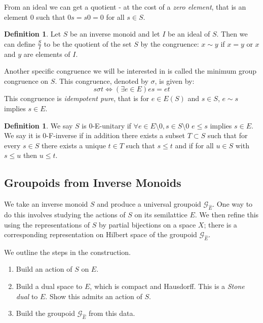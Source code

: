 \documentclass[11pt]{amsart}
\theoremstyle{plain}
\theoremstyle{definition}%
\newtheorem{definition}[theorem]{Definition}%
\theoremstyle{remark}%
\newcommand{\G}{\mathcal{G}}
\newcommand{\E}{\widehat{E}}
\begin{document}
From an ideal we can get a quotient - at the cost of a \textit{zero element}, that is an element $0$ such that $0s=s0=0$ for all $s \in S$.

\begin{definition}
Let $S$ be an inverse monoid and let $I$ be an ideal of $S$. Then we can define $\frac{S}{I}$ to be the quotient of the set $S$ by the congruence: $x \sim y$ if $x=y$ or $x$ and $y$ are elements of $I$. 
\end{definition}

Another specific congruence we will be interested in is called the minimum group congruence on $S$.  This congruence, denoted by $\sigma$, is given by:
\begin{equation*}
s \sigma t \Leftrightarrow (\exists e \in E) es = et
\end{equation*}
This congruence is \textit{idempotent pure}, that is for $e \in E(S)$ and $s \in S$, $e \sim s$ implies $s \in E$.

\begin{definition}
We say $S$ is 0-E-unitary if $\forall e \in E\setminus 0, s \in S \setminus 0$ $e \leq s$ implies $s \in E$. We say it is 0-F-inverse if in addition there exists a subset $T \subset S$ such that for every $s \in S$ there exists a unique $t \in T$ such that $s \leq t$ and if for all $u \in S$ with $s \leq u$ then $u \leq t$.
\end{definition}

\subsection{Groupoids from Inverse Monoids}
We take an inverse monoid $S$ and produce a universal groupoid $\G_{\E}$. One way to do this involves studying the actions of $S$ on its semilattice $E$. We then refine this using  the representations of $S$ by partial bijections on a space $X$; there is a corresponding representation on Hilbert space of the groupoid $\G_{\E}$.

We outline the steps in the construction.
\begin{enumerate}
\item Build an action of $S$ on $E$.
\item Build a dual space to $E$, which is compact and Hausdorff. This is a \textit{Stone dual} to $E$. Show this admits an action of $S$.
\item Build the groupoid $\G_{\E}$ from this data.
\end{enumerate}
\end{document}
